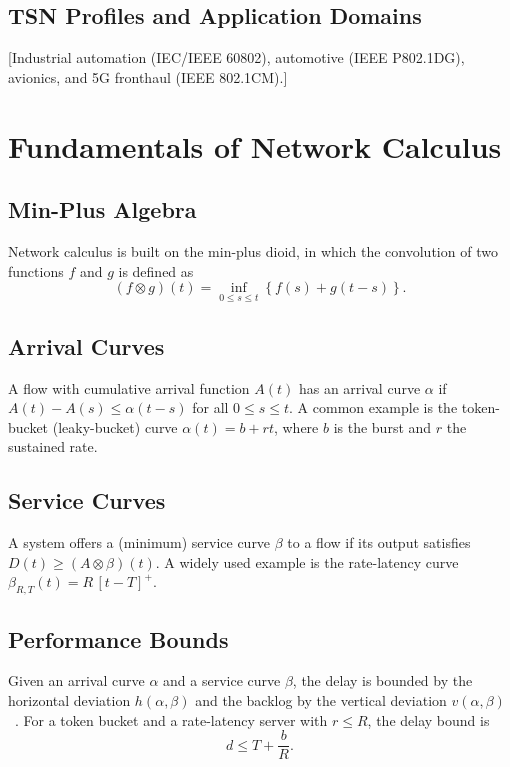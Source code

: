 \documentclass[journal]{IEEEtran}
\begin{document}
\subsection{TSN Profiles and Application Domains}
[Industrial automation (IEC/IEEE 60802), automotive (IEEE P802.1DG), avionics, and 5G fronthaul (IEEE 802.1CM).]


\section{Fundamentals of Network Calculus}
\label{sec:nc}

\subsection{Min-Plus Algebra}
Network calculus is built on the min-plus dioid, in which the convolution of two functions $f$ and $g$ is defined as
\begin{equation}
(f \otimes g)(t) = \inf_{0 \le s \le t} \left\{ f(s) + g(t-s) \right\}.
\end{equation}

\subsection{Arrival Curves}
A flow with cumulative arrival function $A(t)$ has an arrival curve $\alpha$ if $A(t) - A(s) \le \alpha(t-s)$ for all $0 \le s \le t$. A common example is the token-bucket (leaky-bucket) curve $\alpha(t) = b + r t$, where $b$ is the burst and $r$ the sustained rate.

\subsection{Service Curves}
A system offers a (minimum) service curve $\beta$ to a flow if its output satisfies $D(t) \ge (A \otimes \beta)(t)$. A widely used example is the rate-latency curve $\beta_{R,T}(t) = R\,[t-T]^{+}$.

\subsection{Performance Bounds}
Given an arrival curve $\alpha$ and a service curve $\beta$, the delay is bounded by the horizontal deviation $h(\alpha,\beta)$ and the backlog by the vertical deviation $v(\alpha,\beta)$~\cite{leboudec2001network}. For a token bucket and a rate-latency server with $r \le R$, the delay bound is
\begin{equation}
d \le T + \frac{b}{R}.
\end{equation}
\end{document}
